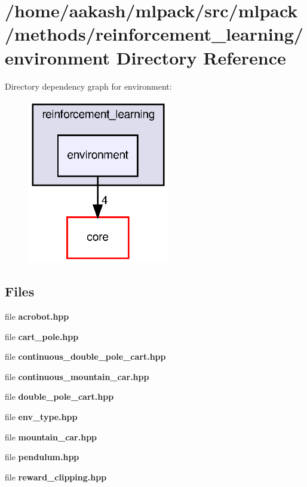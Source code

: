 \section{/home/aakash/mlpack/src/mlpack/methods/reinforcement\+\_\+learning/environment Directory Reference}
\label{dir_dadfacd9b296f7d97039a88d81ab8520}
Directory dependency graph for environment\+:
\nopagebreak
\begin{figure}[H]
\begin{center}
\leavevmode
\includegraphics[width=175pt]{dir_dadfacd9b296f7d97039a88d81ab8520_dep}
\end{center}
\end{figure}
\subsection*{Files}
\begin{DoxyCompactItemize}
\item 
file \textbf{ acrobot.\+hpp}
\item 
file \textbf{ cart\+\_\+pole.\+hpp}
\item 
file \textbf{ continuous\+\_\+double\+\_\+pole\+\_\+cart.\+hpp}
\item 
file \textbf{ continuous\+\_\+mountain\+\_\+car.\+hpp}
\item 
file \textbf{ double\+\_\+pole\+\_\+cart.\+hpp}
\item 
file \textbf{ env\+\_\+type.\+hpp}
\item 
file \textbf{ mountain\+\_\+car.\+hpp}
\item 
file \textbf{ pendulum.\+hpp}
\item 
file \textbf{ reward\+\_\+clipping.\+hpp}
\end{DoxyCompactItemize}
